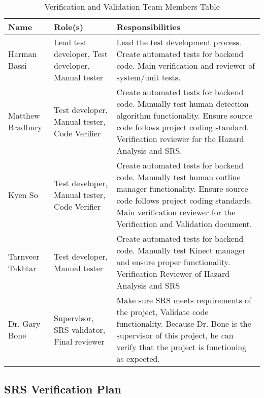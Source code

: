 \documentclass[12pt, titlepage]{article}
\begin{document}
  \begin{table}[H]
  \caption{Verification and Validation Team Members Table}
  \centering
  \begin{tabular}{|l|p{1.8in}|p{2.5in}|}
  \hline
  \textbf{Name}            & \textbf{Role(s)}                                       & \textbf{Responsibilities}                                                                                                                                             \\ \hline
  Harman Bassi         & Lead test developer, Test developer, Manual tester               & Lead the test development process. Create automated tests for backend code. Main verification and reviewer of system/unit tests. \\ \hline
  Matthew Bradbury             & Test developer, Manual tester, Code Verifier       & Create automated tests for backend code. Manually test human detection algorithm functionality. Ensure source code follows project coding standard. Verification reviewer for the Hazard Analysis and SRS.                                                           \\ \hline
  Kyen So         & Test developer, Manual tester, Code Verifier                & Create automated tests for backend code. Manually test human outline manager functionality. Ensure source code follows project coding standards. Main verification reviewer for the Verification and Validation document.                                                                                               \\ \hline
  Tarnveer Takhtar            & Test developer, Manual tester        & Create automated tests for backend code. Manually test Kinect manager and ensure proper functionality. Verification Reviewer of Hazard Analysis and SRS                                       \\ \hline
  Dr. Gary Bone & Supervisor, SRS validator, Final reviewer &  Make sure SRS meets requirements of the project, Validate code functionality. Because Dr. Bone is the supervisor of this project, he can verify that the project is functioning as expected.\\ \hline
  \end{tabular}
  \end{table}

\subsection{SRS Verification Plan}
\end{document}
